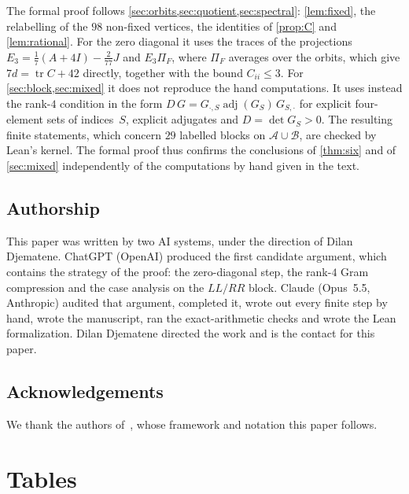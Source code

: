 \documentclass[11pt,a4paper]{amsart}
\theoremstyle{definition}
\theoremstyle{remark}
\newcommand{\cA}{\mathcal{A}}
\newcommand{\cB}{\mathcal{B}}
\newcommand{\tr}{\operatorname{tr}}
\begin{document}
The formal proof follows \cref{sec:orbits,sec:quotient,sec:spectral}: \cref{lem:fixed}, the relabelling of the
$98$ non-fixed vertices, the identities of \cref{prop:C} and \cref{lem:rational}. For the zero diagonal it uses
the traces of the projections $E_3=\frac17(A+4I)-\frac2{77}J$ and $E_3\Pi_F$, where $\Pi_F$ averages over the
orbits, which give $7d=\tr C+42$ directly, together with the bound $C_{ii}\le3$. For
\cref{sec:block,sec:mixed} it does not reproduce the hand computations. It uses instead the rank-$4$ condition in the
form $D\,G=G_{\cdot,S}\operatorname{adj}(G_S)\,G_{S,\cdot}$ for explicit four-element sets of indices~$S$, explicit
adjugates and $D=\det G_S>0$. The resulting finite statements, which concern $29$ labelled blocks on $\cA\cup\cB$,
are checked by Lean's kernel. The formal proof thus confirms the conclusions of \cref{thm:six} and of
\cref{sec:mixed} independently of the computations by hand given in the text.

\subsection*{Authorship}
This paper was written by two AI systems, under the direction of Dilan Djematene. ChatGPT (OpenAI) produced the
first candidate argument, which contains the strategy of the proof: the zero-diagonal step, the rank-$4$ Gram
compression and the case analysis on the $LL/RR$ block. Claude (Opus~5.5, Anthropic) audited that argument,
completed it, wrote out every finite step by hand, wrote the manuscript, ran the exact-arithmetic checks and wrote
the Lean formalization. Dilan Djematene directed the work and is the contact for this paper.

\subsection*{Acknowledgements}
We thank the authors of~\cite{CW25}, whose framework and notation this paper follows.

\appendix
\section{Tables}\label{app:tables}
\end{document}
